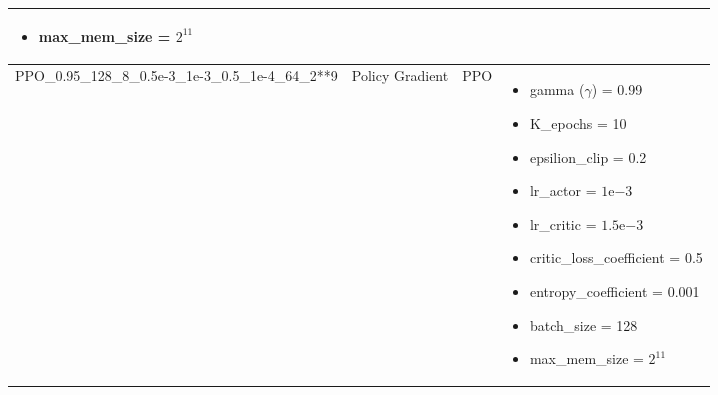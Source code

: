 \begin{longtable}[h]{|p{3.5cm}|p{2.5cm}|p{1.5cm}|p{6cm}|}
\begin{itemize}
		\item max\_mem\_size = $2^{11}$
	\end{itemize} 
	\\
	\hline
	PPO\_0.95\_128\_8\_0.5e-3\_1e-3\_0.5\_1e-4\_64\_2**9 & Policy Gradient & PPO & 
	\begin{itemize}
		\item gamma ($\gamma$) =  0.99
		\item K\_epochs = 10
		\item epsilion\_clip = 0.2
		\item lr\_actor = $1\mathrm{e}{-3}$
		\item lr\_critic = $1.5\mathrm{e}{-3}$
		\item critic\_loss\_coefficient = 0.5
		\item entropy\_coefficient = 0.001
		\item batch\_size = 128
		\item max\_mem\_size = $2^{11}$
	\end{itemize} 
	\\
	\hline
\end{longtable}
